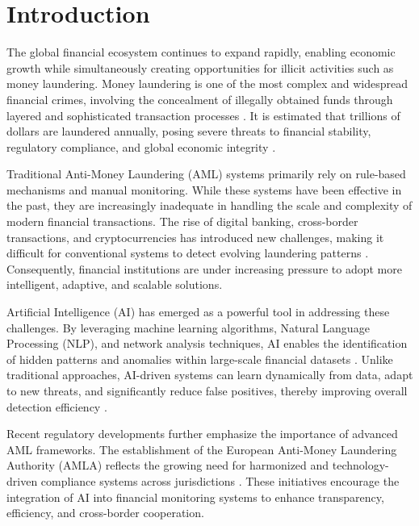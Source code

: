 \documentclass[twoside,twocolumn,10pt]{article}
\begin{document}
\section{Introduction}
\fontsize{11}{13}\selectfont

The global financial ecosystem continues to expand rapidly, enabling economic growth while simultaneously creating opportunities for illicit activities such as money laundering. Money laundering is one of the most complex and widespread financial crimes, involving the concealment of illegally obtained funds through layered and sophisticated transaction processes \cite{ref1}. It is estimated that trillions of dollars are laundered annually, posing severe threats to financial stability, regulatory compliance, and global economic integrity \cite{ref2}.

Traditional Anti-Money Laundering (AML) systems primarily rely on rule-based mechanisms and manual monitoring. While these systems have been effective in the past, they are increasingly inadequate in handling the scale and complexity of modern financial transactions. The rise of digital banking, cross-border transactions, and cryptocurrencies has introduced new challenges, making it difficult for conventional systems to detect evolving laundering patterns \cite{ref3, ref4}. Consequently, financial institutions are under increasing pressure to adopt more intelligent, adaptive, and scalable solutions.

Artificial Intelligence (AI) has emerged as a powerful tool in addressing these challenges. By leveraging machine learning algorithms, Natural Language Processing (NLP), and network analysis techniques, AI enables the identification of hidden patterns and anomalies within large-scale financial datasets \cite{ref5}. Unlike traditional approaches, AI-driven systems can learn dynamically from data, adapt to new threats, and significantly reduce false positives, thereby improving overall detection efficiency \cite{ref6}.

Recent regulatory developments further emphasize the importance of advanced AML frameworks. The establishment of the European Anti-Money Laundering Authority (AMLA) reflects the growing need for harmonized and technology-driven compliance systems across jurisdictions \cite{ref7, ref8}. These initiatives encourage the integration of AI into financial monitoring systems to enhance transparency, efficiency, and cross-border cooperation.
\end{document}
